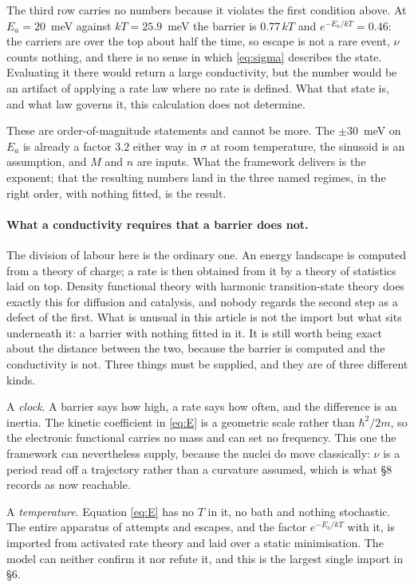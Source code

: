 \documentclass[11pt]{article}
\begin{document}
The third row carries no numbers because it violates the first condition above. At $E_a=20$~meV
against $kT=25.9$~meV the barrier is $0.77\,kT$ and $e^{-E_a/kT}=0.46$: the carriers are over the
top about half the time, so escape is not a rare event, $\nu$ counts nothing, and there is no sense
in which \eqref{eq:sigma} describes the state. Evaluating it there would
return a large conductivity, but the number would be an artifact of applying a rate law where no
rate is defined. What that state is, and what law governs it, this calculation does not determine.

These are order-of-magnitude statements and cannot be more. The $\pm30$~meV on $E_a$ is already a
factor $3.2$ either way in $\sigma$ at room temperature, the sinusoid is an assumption, and $M$ and
$n$ are inputs. What the framework delivers is the exponent; that the resulting numbers land in the
three named regimes, in the right order, with nothing fitted, is the result.

\paragraph{What a conductivity requires that a barrier does not.} The division of labour here is the
ordinary one. An energy landscape is computed from a theory of charge; a rate is then obtained from
it by a theory of statistics laid on top. Density functional theory with harmonic transition-state
theory does exactly this for diffusion and catalysis, and nobody regards the second step as a defect
of the first. What is unusual in this article is not the import but what sits underneath it: a
barrier with nothing fitted in it. It is still worth being exact about the distance between the two,
because the barrier is computed and the conductivity is not. Three things must be supplied, and
they are of three different kinds.

A \emph{clock}. A barrier says how high, a rate says how often, and the difference is an inertia.
The kinetic coefficient in \eqref{eq:E} is a geometric scale rather than $\hbar^2/2m$, so the
electronic functional carries no mass and can set no frequency. This one the framework can
nevertheless supply, because the nuclei do move classically: $\nu$ is a period read off a
trajectory rather than a curvature assumed, which is what \S8 records as now reachable.

A \emph{temperature}. Equation \eqref{eq:E} has no $T$ in it, no bath and nothing stochastic. The
entire apparatus of attempts and escapes, and the factor $e^{-E_a/kT}$ with it, is imported from
activated rate theory and laid over a static minimisation. The model can neither confirm it nor
refute it, and this is the largest single import in \S6.
\end{document}
